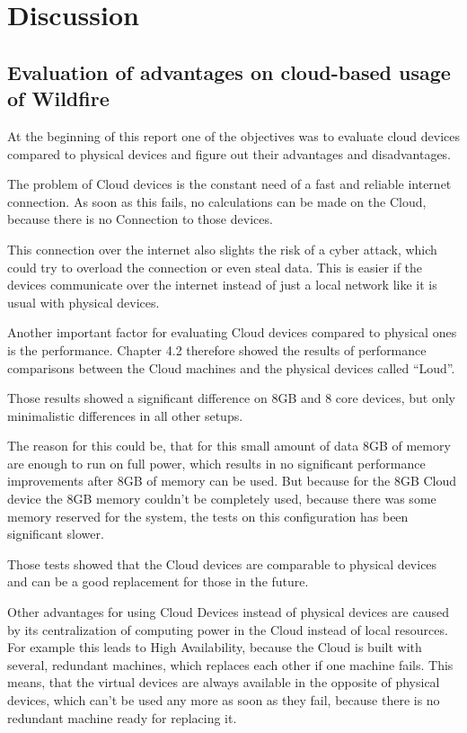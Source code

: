 
\chapter{Discussion}

\section{Evaluation of advantages on cloud-based usage of Wildfire}

At the beginning of this report one of the objectives was to evaluate cloud devices compared to physical devices and figure out their advantages and disadvantages.

The problem of Cloud devices is the constant need of a fast and reliable internet connection. As soon as this fails, no calculations can be made on the Cloud, because there is no Connection to those devices.

This connection over the internet also slights the risk of a cyber attack, which could try to overload the connection or even steal data. This is easier if the devices communicate over the internet instead of just a local network like it is usual with physical devices.

Another important factor for evaluating Cloud devices compared to physical ones is the performance. Chapter 4.2 therefore showed the results of performance comparisons between the Cloud machines and the physical devices called ``Loud''.

Those results showed a significant difference on 8GB and 8 core devices, but only minimalistic differences in all other setups.

The reason for this could be, that for this small amount of data 8GB of memory are enough to run on full power, which results in no significant performance improvements after 8GB of memory can be used. But because for the 8GB Cloud device the 8GB memory couldn't be completely used, because there was some memory reserved for the system, the tests on this configuration has been significant slower.

Those tests showed that the Cloud devices are comparable to physical devices and can be a good replacement for those in the future.

Other advantages for using Cloud Devices instead of physical devices are caused by its centralization of computing power in the Cloud instead of local resources. For example this leads to High Availability, because the Cloud is built with several, redundant machines, which replaces each other if one machine fails. This means, that the virtual devices are always available in the opposite of physical devices, which can't be used any more as soon as they fail, because there is no redundant machine ready for replacing it.

